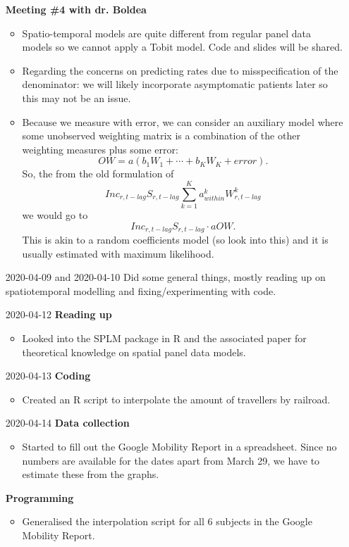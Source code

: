 \documentclass{article}
\begin{document}
\begin{itemize}
	\textbf{Meeting \#4 with dr. Boldea}
	\begin{itemize}
		\item Spatio-temporal models are quite different from regular panel data models so we cannot apply a Tobit model. Code and slides will be shared.
		\item Regarding the concerns on predicting rates due to misspecification of the denominator: we will likely incorporate asymptomatic patients later so this may not be an issue.
		\item Because we measure with error, we can consider an auxiliary model where some unobserved weighting matrix is a combination of the other weighting measures plus some error:
		\[OW = a(b_1W_1 + \cdots + b_KW_K + error).\]
		So, the from the old formulation of
		\[Inc_{r,t-lag} S_{r,t-lag} \sum_{k=1}^K a^k_{within}W^k_{r, t-lag}\]
		we would go to
		\[Inc_{r,t-lag} S_{r,t-lag} \cdot aOW.\]
		This is akin to a random coefficients model (so look into this) and it is usually estimated with maximum likelihood.
	\end{itemize}
	
	\item[2020-04-09 and 2020-04-10]
	Did some general things, mostly reading up on spatiotemporal modelling and fixing/experimenting with code.
	
	\item[2020-04-12]
	\textbf{Reading up}
	\begin{itemize}
		\item Looked into the SPLM package in R and the associated paper for theoretical knowledge on spatial panel data models.
	\end{itemize}
	
	\item[2020-04-13]
	\textbf{Coding}
	\begin{itemize}
		\item Created an R script to interpolate the amount of travellers by railroad.
	\end{itemize}
	
	\item[2020-04-14]
	\textbf{Data collection}
	\begin{itemize}
		\item Started to fill out the Google Mobility Report in a spreadsheet. Since no numbers are available for the dates apart from March 29, we have to estimate these from the graphs.
	\end{itemize}

	\textbf{Programming}
	\begin{itemize}
		\item Generalised the interpolation script for all 6 subjects in the Google Mobility Report.
	\end{itemize}
	

\end{itemize}
\end{document}

